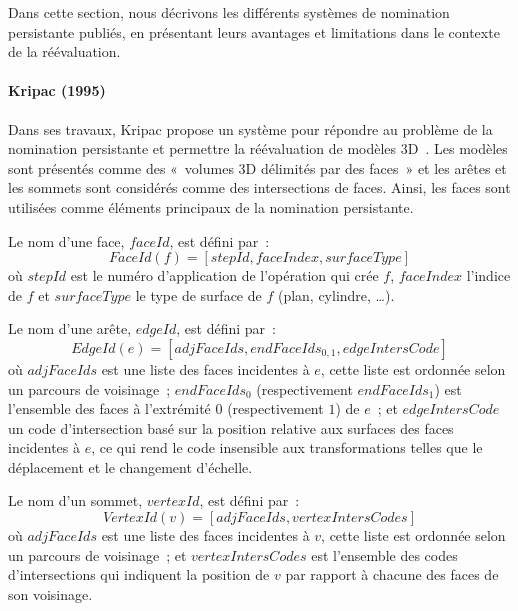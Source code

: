 Dans cette section, nous décrivons les différents systèmes de nomination persistante publiés, en présentant leurs avantages et limitations dans le contexte de la réévaluation. %

\paragraph*{Kripac (1995)}

Dans ses travaux, Kripac propose un système pour répondre au problème de la
nomination persistante et permettre la réévaluation de modèles
3D~\cite{kripac1995mechanism}. %
Les modèles sont présentés comme des «~volumes 3D délimités par des faces~» et
les arêtes et les sommets sont considérés comme des intersections de faces. %
Ainsi, les faces sont utilisées comme éléments principaux de la nomination
persistante. %

Le nom d'une face, \(faceId\), est défini par~:
\[FaceId(f) = [stepId,faceIndex,surfaceType]\] %
où \(stepId\) est le numéro d'application de l'opération qui crée \(f\),
\(faceIndex\) l'indice de \(f\) et \(surfaceType\) le type de surface de \(f\) (plan, cylindre, …). %

Le nom d'une arête, \(edgeId\), est défini par~:
\[EdgeId(e) = [adjFaceIds,endFaceIds_{0,1},edgeIntersCode]\] %
où \(adjFaceIds\) est une liste des faces incidentes à \(e\), cette liste est
ordonnée selon un parcours de voisinage~; \(endFaceIds_{0}\) (respectivement
\(endFaceIds_{1}\)) est l'ensemble des faces à l'extrémité \(0\) (respectivement
\(1\)) de \(e\)~; et \(edgeIntersCode\) un code d'intersection basé sur la
position relative aux surfaces des faces incidentes à \(e\), ce qui rend le
code insensible aux transformations telles que le déplacement et le changement
d'échelle. %

Le nom d'un sommet, \(vertexId\), est défini par~:
\[VertexId(v) = [adjFaceIds,vertexIntersCodes]\] %
où \(adjFaceIds\) est une liste des faces incidentes à \(v\), cette liste est
ordonnée selon un parcours de voisinage~; et \(vertexIntersCodes\) est
l'ensemble des codes d'intersections qui indiquent la position de \(v\) par rapport à chacune des faces de
son voisinage.

